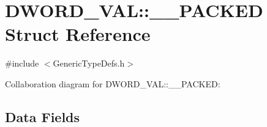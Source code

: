 \hypertarget{struct_d_w_o_r_d___v_a_l_1_1_____p_a_c_k_e_d}{}\section{D\+W\+O\+R\+D\+\_\+\+V\+A\+L\+:\+:\+\_\+\+\_\+\+P\+A\+C\+K\+E\+D Struct Reference}
\label{struct_d_w_o_r_d___v_a_l_1_1_____p_a_c_k_e_d}


{\ttfamily \#include $<$Generic\+Type\+Defs.\+h$>$}



Collaboration diagram for D\+W\+O\+R\+D\+\_\+\+V\+A\+L\+:\+:\+\_\+\+\_\+\+P\+A\+C\+K\+E\+D\+:
\subsection*{Data Fields}
